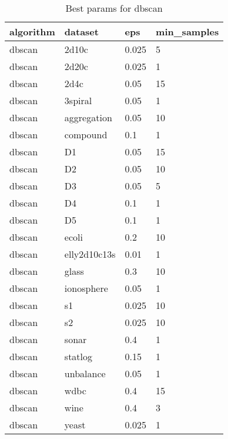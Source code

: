 \begin{table}[H]
\centering
\caption{Best params for dbscan}
\label{tab:params:dbscan}
\begin{tabular}{|l|l|l|l|}
\hline
algorithm & dataset & eps & min\_samples \\
\hline
dbscan & 2d10c & 0.025 & 5 \\
\hline
dbscan & 2d20c & 0.025 & 1 \\
\hline
dbscan & 2d4c & 0.05 & 15 \\
\hline
dbscan & 3spiral & 0.05 & 1 \\
\hline
dbscan & aggregation & 0.05 & 10 \\
\hline
dbscan & compound & 0.1 & 1 \\
\hline
dbscan & D1 & 0.05 & 15 \\
\hline
dbscan & D2 & 0.05 & 10 \\
\hline
dbscan & D3 & 0.05 & 5 \\
\hline
dbscan & D4 & 0.1 & 1 \\
\hline
dbscan & D5 & 0.1 & 1 \\
\hline
dbscan & ecoli & 0.2 & 10 \\
\hline
dbscan & elly2d10c13s & 0.01 & 1 \\
\hline
dbscan & glass & 0.3 & 10 \\
\hline
dbscan & ionosphere & 0.05 & 1 \\
\hline
dbscan & s1 & 0.025 & 10 \\
\hline
dbscan & s2 & 0.025 & 10 \\
\hline
dbscan & sonar & 0.4 & 1 \\
\hline
dbscan & statlog & 0.15 & 1 \\
\hline
dbscan & unbalance & 0.05 & 1 \\
\hline
dbscan & wdbc & 0.4 & 15 \\
\hline
dbscan & wine & 0.4 & 3 \\
\hline
dbscan & yeast & 0.025 & 1 \\
\hline
\end{tabular}
\end{table}